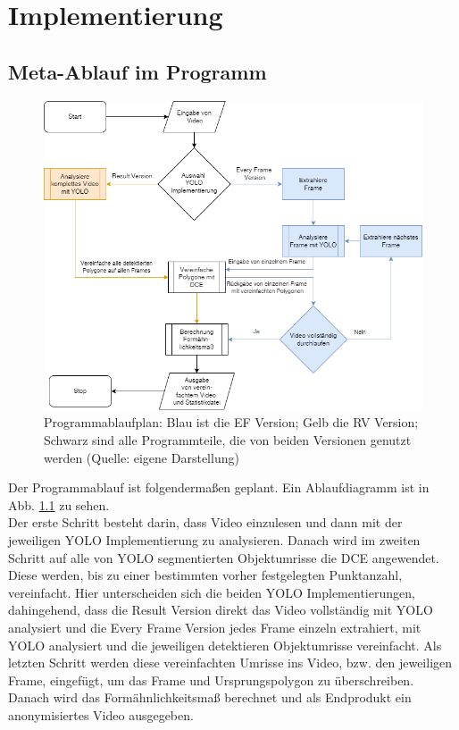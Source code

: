\chapter{Implementierung} 
\label{ch:implementierung}

	\section{Meta-Ablauf im Programm}{
	\begin{figure}[h]
		\centering
		\includegraphics*[scale = 0.5, keepaspectratio]{images/Ablaufdiagram.png}
		\caption[Programmablaufplan]{Programmablaufplan: Blau ist die EF Version; Gelb die RV Version; Schwarz sind alle Programmteile, die von beiden Versionen genutzt werden (Quelle: eigene Darstellung)}
		\label{pic:Programmablaufplan}
	\end{figure}

	Der Programmablauf ist folgendermaßen geplant. Ein Ablaufdiagramm ist in Abb. \ref{pic:Programmablaufplan} zu sehen. \\  Der erste Schritt besteht darin, dass Video einzulesen und dann mit der jeweiligen YOLO Implementierung zu analysieren. Danach wird im zweiten Schritt auf alle von YOLO segmentierten Objektumrisse die DCE angewendet. Diese werden, bis zu einer bestimmten vorher festgelegten Punktanzahl, vereinfacht. Hier unterscheiden sich die beiden YOLO Implementierungen, dahingehend, dass die Result Version direkt das Video vollständig mit YOLO analysiert und die Every Frame Version jedes Frame einzeln extrahiert, mit YOLO analysiert und die jeweiligen detektieren Objektumrisse vereinfacht. Als letzten Schritt werden diese vereinfachten Umrisse ins Video, bzw. den jeweiligen Frame, eingefügt, um das Frame und Ursprungspolygon zu überschreiben. Danach wird das Formähnlichkeitsmaß berechnet und als Endprodukt ein anonymisiertes Video ausgegeben. 
	}


